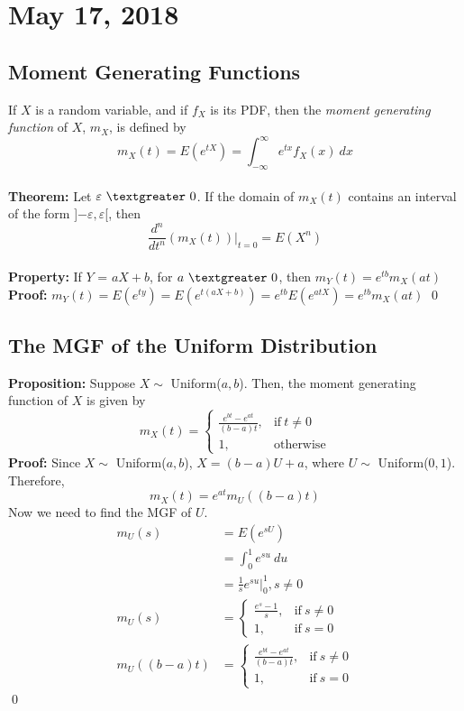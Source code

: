 \documentclass{article}
\newcommand{\ti}[1]{\textit{#1}}
\newcommand{\tb}[1]{\textbf{#1}}
\newcommand{\ep}{\varepsilon}
\newcommand{\gt}{\textgreater}
\begin{document}
\section{May 17, 2018}
\subsection{Moment Generating Functions}
If $X$ is a random variable, and if $f_{X}$ is its PDF, then the \ti{moment generating function} of $X$, $m_{X}$, is defined by
\[m_{X}(t) = E(e^{tX}) = \int_{-\infty}^{\infty} e^{tx}f_{X}(x)\ dx\]\\
\tb{Theorem:} Let $\ep\ \gt\ 0$. If the domain of $m_{X}(t)$ contains an interval of the form ]$-\ep, \ep$[, then
\[\frac{d^{n}}{dt^{n}}(m_{X}(t))\Big\rvert_{t=0} = E(X^{n})\]\\
\tb{Property:} If $Y$ = $aX+b$, for $a\ \gt\ 0$, then $m_{Y}(t) = e^{tb}m_{X}(at)$\\
\tb{Proof:} $m_{Y}(t) = E(e^{ty}) = E(e^{t(aX+b)}) = e^{tb}E(e^{atX}) = e^{tb}m_{X}(at)$
\qed
\subsection{The MGF of the Uniform Distribution}
\tb{Proposition:} Suppose $X \sim$ Uniform($a, b$). Then, the moment generating function of $X$ is given by
\[m_{X}(t) =
\begin{cases}
	\frac{e^{bt}-e^{at}}{(b-a)t}, &\text{if}\ t \neq 0\\
	1, &\text{otherwise} 
\end{cases}
\]
\tb{Proof:} Since $X \sim$ Uniform($a, b$), $X=(b-a)U + a$, where $U \sim$ Uniform($0, 1$). Therefore,
\[m_{X}(t)=e^{at}m_{U}((b-a)t)\]
Now we need to find the MGF of $U$.
\begin{align*}
	m_{U}(s) &= E(e^{sU})\\
			&= \int_{0}^{1} e^{su}\ du\\
			&= \frac{1}{s}e^{su}\Big\rvert_{0}^{1}, s \neq 0\\
	m_{U}(s)	&=
				\begin{cases}
					\frac{e^{s}-1}{s}, &\text{if}\ s \neq 0\\
					1, &\text{if}\ s = 0
				\end{cases}\\
	m_{U}((b-a)t) &= 
				\begin{cases}
					\frac{e^{bt}-e^{at}}{(b-a)t}, &\text{if}\ s \neq 0\\
					1, &\text{if}\ s = 0
				\end{cases}
\end{align*}
\qed
\end{document}
